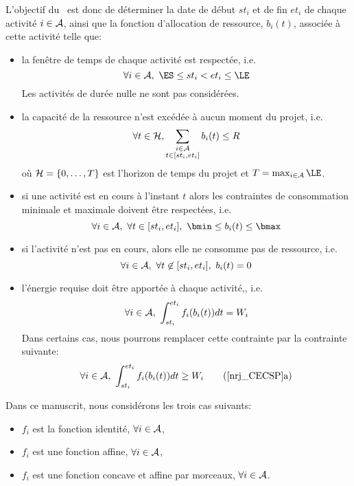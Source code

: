 L'objectif du \CECSP~est donc de déterminer la date de début $st_i$ et
de fin $et_i$ de chaque activité $i \in {\cal A}$, ainsi que la fonction
d'allocation de ressource, $b_i(t)$, associée à
cette activité telle que: 
\begin{itemize}
\item la fenêtre de temps de chaque activité est respectée, i.e. 
  \begin{equation} 
    \forall i \in \A,\ \ES \le st_i < et_i \le \LE \label{tw_CECSP}
  \end{equation}
  Les activités de durée nulle ne sont pas considérées. 
\item la capacité de la ressource n'est excédée à aucun moment du
  projet, i.e.
  \begin{equation} 
    \forall t \in {\cal H},\sum_{\substack{i\in {\cal A}\\ t \in
        [st_i,et_i]}} b_i(t) \le  R \label{res_CECSP}
  \end{equation}
  où ${\cal H}=\{0,\dots,T\}$ est l'horizon de temps du projet et $T=\max_{i
    \in \A} \LE$.
\item si une activité est en cours à l'instant $t$ alors les
  contraintes de consommation minimale et maximale doivent être
  respectées, i.e.  
  \begin{equation}
    \forall i \in \A,\ \forall t \in [st_i,et_i],\ \bmin \le b_i(t) \le
    \bmax \label{req_CECSP}
  \end{equation}
\item si l'activité n'est pas en cours, alors elle ne consomme pas de
  ressource, i.e.
  \begin{equation}
    \label{nulleConso_CECSP}
    \forall i \in {\cal A},\ \forall t \not\in [st_i,et_i],\  b_i(t)=0 
  \end{equation}
\item l'énergie requise doit être apportée à chaque activité,, i.e. 
  \begin{equation}
    \forall i \in \A,\ \int_{st_i}^{et_i}f_i(b_i(t))dt=W_i \label{nrj_CECSP}
  \end{equation}
  Dans certains cas, nous pourrons remplacer cette contrainte par la
  contrainte suivante:
  \begin{equation}
    \forall i \in \A,\ \int_{st_i}^{et_i}f_i(b_i(t))dt \ge W_i \tag{\ref{nrj_CECSP}a}
  \end{equation}
\end{itemize}

Dans ce manuscrit, nous considérons les trois cas
suivants:
\begin{itemize}
\item $f_i$ est la fonction identité, $\forall i \in {\cal A}$,
\item $f_i$ est une fonction affine, $\forall i \in {\cal A}$,
\item $f_i$ est une fonction concave et affine par morceaux, $\forall
  i \in {\cal A}$.
\end{itemize}


